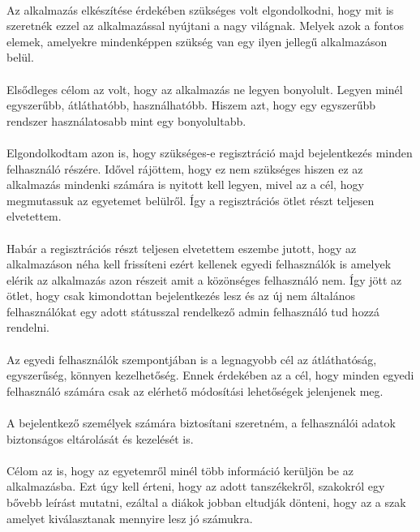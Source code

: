 \documentclass{article}
\begin{document}
	\paragraph{}
	Az alkalmazás elkészítése érdekében szükséges volt elgondolkodni, hogy mit is szeretnék ezzel az alkalmazással nyújtani a nagy világnak. Melyek azok a fontos elemek, amelyekre mindenképpen szükség van egy ilyen jellegű alkalmazáson belül.
	\paragraph{}
	Elsődleges célom az volt, hogy az alkalmazás ne legyen bonyolult. Legyen minél egyszerűbb, átláthatóbb, használhatóbb. Hiszem azt, hogy egy egyszerűbb rendszer használatosabb mint egy bonyolultabb.
	\paragraph{}
	Elgondolkodtam azon is, hogy szükséges-e regisztráció majd bejelentkezés minden felhasználó részére. Idővel rájöttem, hogy ez nem szükséges hiszen ez az alkalmazás mindenki számára is nyitott kell legyen, mivel az a cél, hogy megmutassuk az egyetemet belülről. Így a regisztrációs ötlet részt teljesen elvetettem.
	\paragraph{}
	Habár a regisztrációs részt teljesen elvetettem eszembe jutott, hogy az alkalmazáson néha kell frissíteni ezért kellenek egyedi felhasználók is amelyek elérik az alkalmazás azon részeit amit a közönséges felhasználó nem. Így jött az ötlet, hogy csak kimondottan bejelentkezés lesz és az új nem általános felhasználókat egy adott státusszal rendelkező admin felhasználó tud hozzá rendelni.
	\paragraph{}
	Az egyedi felhasználók szempontjában is a legnagyobb cél az átláthatóság, egyszerűség, könnyen kezelhetőség. Ennek érdekében az a cél, hogy minden egyedi felhasználó számára csak az elérhető módosítási lehetőségek jelenjenek meg. 
	\paragraph{}
	A bejelentkező személyek számára biztosítani szeretném, a felhasználói adatok biztonságos eltárolását és kezelését is.
	\paragraph{}
	Célom az is, hogy az egyetemről minél több információ kerüljön be az alkalmazásba. Ezt úgy kell érteni, hogy az adott tanszékekről, szakokról egy bővebb leírást mutatni, ezáltal a diákok jobban eltudják dönteni, hogy az a szak amelyet kiválasztanak mennyire lesz jó számukra.
\end{document}
